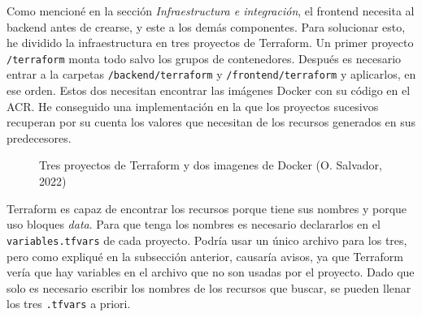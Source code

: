 \documentclass[11pt]{article}
\begin{document}
\begin{flushleft}
	 Como mencioné en la sección \textit{Infraestructura e integración}, el frontend necesita al backend antes de crearse, y este a los demás componentes. Para solucionar esto, he dividido la infraestructura en tres proyectos de Terraform. Un primer proyecto \texttt{/terraform} monta todo salvo los grupos de contenedores. Después es necesario entrar a la carpetas \texttt{/backend/terraform} y \texttt{/frontend/terraform} y aplicarlos, en ese orden. Estos dos necesitan encontrar las imágenes Docker con su código en el ACR. He conseguido una implementación en la que los proyectos sucesivos recuperan por su cuenta los valores que necesitan de los recursos generados en sus predecesores.
	 \linebreak
	 
	\begin{figure}[htb]
		\centering
		\caption{Tres proyectos de Terraform y dos imagenes de Docker (O. Salvador, 2022)}
	\end{figure}
	
	\clearpage
	Terraform es capaz de encontrar los recursos porque tiene sus nombres y porque uso bloques \textit{data}. Para que tenga los nombres es necesario declararlos en el \texttt{variables.tfvars} de cada proyecto. Podría usar un único archivo para los tres, pero como expliqué en la subsección anterior, causaría avisos, ya que Terraform vería que hay variables en el archivo que no son usadas por el proyecto. Dado que solo es necesario escribir los nombres de los recursos que buscar, se pueden llenar los tres \texttt{.tfvars} a priori. 
	\linebreak
	

\end{flushleft}
\end{document}
